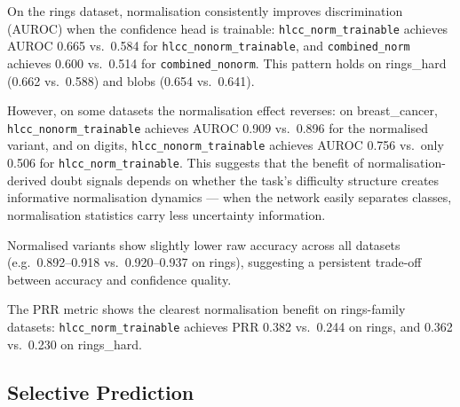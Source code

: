 \documentclass[11pt,a4paper]{article}
\begin{document}
On the rings dataset, normalisation consistently improves discrimination
(AUROC) when the confidence head is trainable:
\texttt{hlcc\_norm\_trainable} achieves AUROC 0.665 vs.\ 0.584 for
\texttt{hlcc\_nonorm\_trainable}, and \texttt{combined\_norm} achieves
0.600 vs.\ 0.514 for \texttt{combined\_nonorm}.  This pattern holds on
rings\_hard (0.662 vs.\ 0.588) and blobs (0.654 vs.\ 0.641).

However, on some datasets the normalisation effect reverses:
on breast\_cancer, \texttt{hlcc\_nonorm\_trainable} achieves AUROC
0.909 vs.\ 0.896 for the normalised variant, and on digits,
\texttt{hlcc\_nonorm\_trainable} achieves AUROC 0.756 vs.\ only 0.506
for \texttt{hlcc\_norm\_trainable}.  This suggests that the benefit of
normalisation-derived doubt signals depends on whether the task's
difficulty structure creates informative normalisation dynamics ---
when the network easily separates classes, normalisation statistics
carry less uncertainty information.

Normalised variants show slightly lower raw accuracy across all
datasets (e.g.\ 0.892--0.918 vs.\ 0.920--0.937 on rings), suggesting
a persistent trade-off between accuracy and confidence quality.

The PRR metric shows the clearest normalisation benefit on
rings-family datasets: \texttt{hlcc\_norm\_trainable} achieves PRR
0.382 vs.\ 0.244 on rings, and 0.362 vs.\ 0.230 on rings\_hard.

\subsection{Selective Prediction}
\end{document}
